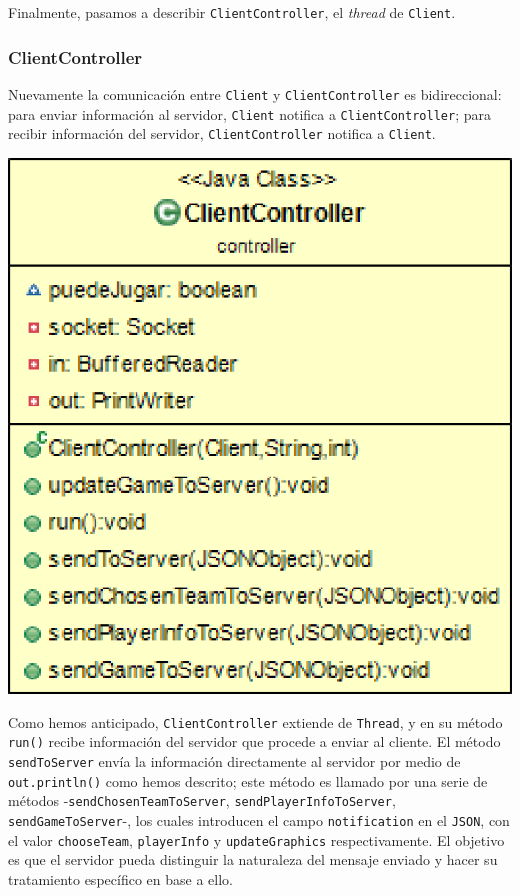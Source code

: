 \documentclass[../DocumentoOficial.tex]{subfiles}
\begin{document}
Finalmente, pasamos a describir \texttt{ClientController}, el \textit{thread} de \texttt{Client}.

\subsubsection{ClientController}
Nuevamente la comunicación entre \texttt{Client} y \texttt{ClientController} es bidireccional: para enviar información al servidor, \texttt{Client} notifica a \texttt{ClientController}; para recibir información del servidor, \texttt{ClientController} notifica a \texttt{Client}.

\begin{center}
\includegraphics[scale=0.45]{ClientController-sprint7.png} 
\end{center}

Como hemos anticipado, \texttt{ClientController} extiende de \texttt{Thread}, y en su método \texttt{run()} recibe información del servidor que procede a enviar al cliente. El método \texttt{sendToServer} envía la información directamente al servidor por medio de \texttt{out.println()} como hemos descrito; este método es llamado por una serie de métodos -\texttt{sendChosenTeamToServer}, \texttt{sendPlayerInfoToServer}, \texttt{sendGameToServer}-, los cuales introducen el campo \texttt{notification} en el \texttt{JSON}, con el valor \texttt{chooseTeam}, \texttt{playerInfo} y \texttt{updateGraphics} respectivamente. El objetivo es que el servidor pueda distinguir la naturaleza del mensaje enviado y hacer su tratamiento específico en base a ello.
\end{document}

